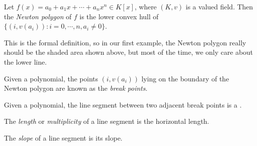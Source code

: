 \documentclass[a4paper]{article}
\begin{document}
\begin{defi}
  Let $f(x) = a_0 + a_1 x + \cdots + a_n x^n \in K[x]$, where $(K, v)$ is a valued field. Then the \emph{Newton polygon} of $f$ is the lower convex hull of $\{(i, v(a_i)): i = 0, \cdots, n, a_i \not= 0\}$.
\end{defi}
This is the formal definition, so in our first example, the Newton polygon really should be the shaded area shown above, but most of the time, we only care about the lower line.

\begin{defi}
  Given a polynomial, the points $(i, v(a_i))$ lying on the boundary of the Newton polygon are known as the \emph{break points}.
\end{defi}

\begin{defi}
  Given a polynomial, the line segment between two adjacent break points is a .
\end{defi}

\begin{defi}
  The \emph{length} or \emph{multiplicity} of a line segment is the horizontal length.
\end{defi}

\begin{defi}[Slope]
  The \emph{slope} of a line segment is its slope.
\end{defi}
\end{document}
